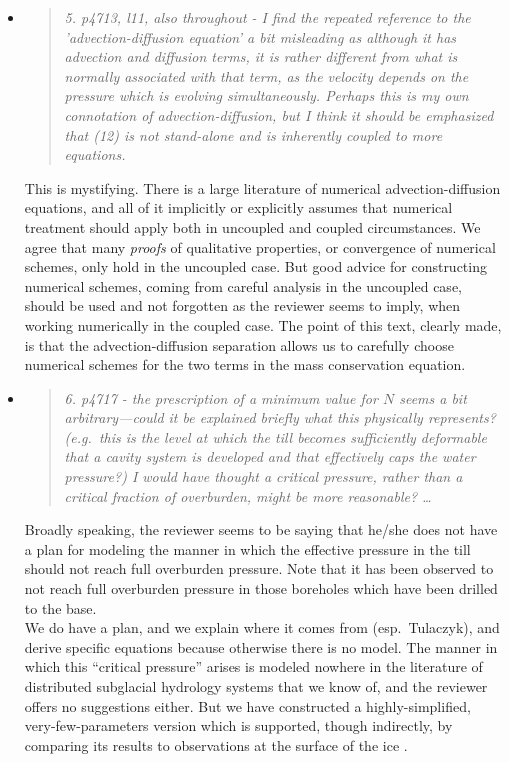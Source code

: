 \documentclass[11pt,reqno]{amsart}
\newcommand{\reply}[2]{
\medskip\medskip
\item  \begin{quote}
\emph{#1}
\end{quote}

\medskip
\noindent #2}
\begin{document}
\begin{itemize}
\reply{5. p4713, l11, also throughout - I find the repeated reference to the 'advection-diffusion equation' a bit misleading as although it has advection and diffusion terms, it is rather different from what is normally associated with that term, as the velocity depends on the pressure which is evolving simultaneously.  Perhaps this is my own connotation of advection-diffusion, but I think it should be emphasized that (12) is not stand-alone and is inherently coupled to more equations.}
{This is mystifying.  There is a large literature of numerical advection-diffusion equations, and all of it implicitly or explicitly assumes that numerical treatment should apply both in uncoupled and coupled circumstances.  We agree that many \emph{proofs} of qualitative properties, or convergence of numerical schemes, only hold in the uncoupled case.  But good advice for constructing numerical schemes, coming from careful analysis in the uncoupled case, should be used and not forgotten as the reviewer seems to imply, when working numerically in the coupled case.  The point of this text, clearly made, is that the advection-diffusion separation allows us to carefully choose numerical schemes for the two terms in the mass conservation equation.}

\reply{6. p4717 - the prescription of a minimum value for $N$ seems a bit arbitrary---could it be explained briefly what this physically represents? (e.g.~this is the level at which the till becomes sufficiently deformable that a cavity system is developed and that effectively caps the water pressure?) I would have thought a critical pressure, rather than a critical fraction of overburden, might be more reasonable? \dots}
{Broadly speaking, the reviewer seems to be saying that he/she does not have a plan for modeling the manner in which the effective pressure in the till should not reach full overburden pressure.  Note that it has been observed to not reach full overburden pressure in those boreholes which have been drilled to the base. \\
\indent We do have a plan, and we explain where it comes from (esp.~Tulaczyk), and derive specific equations because otherwise there is no model.  The manner in which this ``critical pressure'' arises is modeled nowhere in the literature of distributed subglacial hydrology systems that we know of, and the reviewer offers no suggestions either.  But we have constructed a highly-simplified, very-few-parameters version which is supported, though indirectly, by comparing its results to observations at the surface of the ice \cite{AschwandenAdalgeirsdottirKhroulev}.}


\end{itemize}
\end{document}

